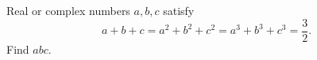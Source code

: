 Real or complex numbers $a,b,c$ satisfy
\[
a+b+c=a^2+b^2+c^2=a^3+b^3+c^3=\dfrac{3}{2} .
\]
Find $abc$.
